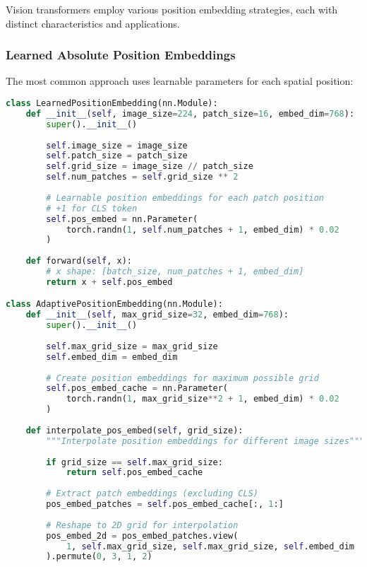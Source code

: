 Vision transformers employ various position embedding strategies, each with distinct characteristics and applications.

\subsubsection{Learned Absolute Position Embeddings}

The most common approach uses learnable parameters for each spatial position:

\begin{lstlisting}[language=Python, caption=Learned absolute position embeddings]
class LearnedPositionEmbedding(nn.Module):
    def __init__(self, image_size=224, patch_size=16, embed_dim=768):
        super().__init__()
        
        self.image_size = image_size
        self.patch_size = patch_size
        self.grid_size = image_size // patch_size
        self.num_patches = self.grid_size ** 2
        
        # Learnable position embeddings for each patch position
        # +1 for CLS token
        self.pos_embed = nn.Parameter(
            torch.randn(1, self.num_patches + 1, embed_dim) * 0.02
        )
    
    def forward(self, x):
        # x shape: [batch_size, num_patches + 1, embed_dim]
        return x + self.pos_embed

class AdaptivePositionEmbedding(nn.Module):
    def __init__(self, max_grid_size=32, embed_dim=768):
        super().__init__()
        
        self.max_grid_size = max_grid_size
        self.embed_dim = embed_dim
        
        # Create position embeddings for maximum possible grid
        self.pos_embed_cache = nn.Parameter(
            torch.randn(1, max_grid_size**2 + 1, embed_dim) * 0.02
        )
    
    def interpolate_pos_embed(self, grid_size):
        """Interpolate position embeddings for different image sizes"""
        
        if grid_size == self.max_grid_size:
            return self.pos_embed_cache
        
        # Extract patch embeddings (excluding CLS)
        pos_embed_patches = self.pos_embed_cache[:, 1:]
        
        # Reshape to 2D grid for interpolation
        pos_embed_2d = pos_embed_patches.view(
            1, self.max_grid_size, self.max_grid_size, self.embed_dim
        ).permute(0, 3, 1, 2)
        

\end{lstlisting}
